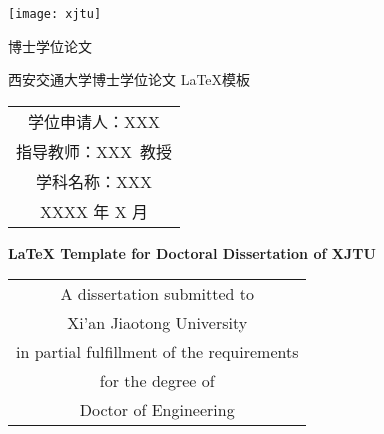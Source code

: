 
\begin{titlepage}
	\begin{center}
		\begin{figure*}[!ht]\vspace{5em}
			\centering
			\texttt{[image: xjtu]}
		\end{figure*}
		
		\vspace{1.5em}
		\begin{center} { 博士学位论文} \end{center}
		
		\vspace{8.5em}
		\begin{center} {\sanhao\hei 西安交通大学博士学位论文 \LaTeX 模板}\end{center}
		
		\vspace{16em}
		{\sanhao
			\begin{center} \renewcommand{\arraystretch}{1.75}
				\begin{tabular}{c}
					学位申请人：XXX \\
					指导教师：XXX~教授 \\
					学科名称：XXX \\
					XXXX 年 X 月 \\
				\end{tabular} \renewcommand{\arraystretch}{1}
			\end{center} 
		}
	\end{center}
	\clearpage{\pagestyle{empty}\cleardoublepage}
	
	\newpage\thispagestyle{empty}
	\begin{center}
		\parbox[t][0.7cm][t]{\textwidth}{}
		
		\begin{center}{\sanhao\bfseries \LaTeX{} Template for Doctoral Dissertation of XJTU}\end{center}
		
		\vspace{4.7cm}
		{\sanhao
			\begin{center} \renewcommand{\arraystretch}{1.4}
				\begin{tabular}{c}
					A dissertation submitted to  \\
					Xi'an Jiaotong University \\
					in partial fulfillment of the requirements \\
					for the degree of \\
					Doctor of Engineering \\
				\end{tabular} \renewcommand{\arraystretch}{1}
			\end{center} 
		}
			

\end{center}
\end{titlepage}
